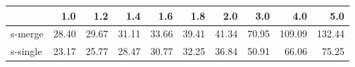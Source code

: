 \begin{tabular}{lrrrrrrrrr}
\toprule
{} &   1.0 &   1.2 &   1.4 &   1.6 &   1.8 &   2.0 &   3.0 &    4.0 &    5.0 \\
\midrule
s-merge  & 28.40 & 29.67 & 31.11 & 33.66 & 39.41 & 41.34 & 70.95 & 109.09 & 132.44 \\
s-single & 23.17 & 25.77 & 28.47 & 30.77 & 32.25 & 36.84 & 50.91 &  66.06 &  75.25 \\
\bottomrule
\end{tabular}
